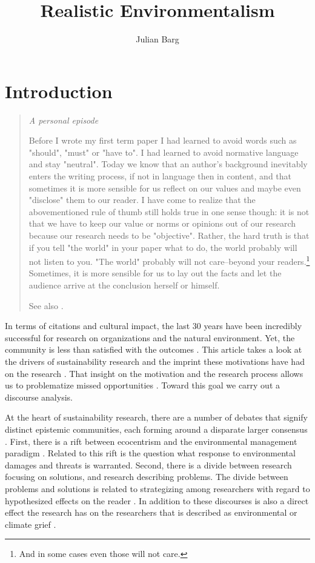 \documentclass{article}
\title{Realistic Environmentalism}
\author{Julian Barg}
\begin{document}
	\maketitle

	\section*{Introduction}

	\begin{quote}
		\itshape
		A personal episode

		Before I wrote my first term paper I had learned to avoid words such as "should", "must" or "have to". I had learned to avoid normative language and stay "neutral". Today we know that an author's background inevitably enters the writing process, if not in language then in content, and that sometimes it is more sensible for us reflect on our values and maybe even "disclose" them to our reader. I have come to realize that the abovementioned rule of thumb still holds true in one sense though: it is not that we have to keep our value or norms or opinions out of our research because our research needs to be "objective". Rather, the hard truth is that if you tell "the world" in your paper what to do, the world probably will not listen to you. "The world" probably will not care--beyond your readers.\footnote{And in some cases even those will not care.} Sometimes, it is more sensible for us to lay out the facts and let the audience arrive at the conclusion herself or himself.

		See also \citet{Gouldner1962,Zbaracki2021-02-03,Jones2019,Boisot2010}.
	\end{quote}

	In terms of citations and cultural impact, the last 30 years have been incredibly successful for research on organizations and the natural environment. Yet, the community is less than satisfied with the outcomes \cite[e.g.,][]{Ergene2020}. This article takes a look at the drivers of sustainability research and the imprint these motivations have had on the research \citep{Latour1987}. That insight on the motivation and the research process allows us to problematize missed opportunities \citep{Alvesson2011}. Toward this goal we carry out a discourse analysis.

	At the heart of sustainability research, there are a number of debates that signify distinct epistemic communities, each forming around a disparate larger consensus \citep[cf.][]{KnorrCetina1999}. First, there is a rift between ecocentrism and the environmental management paradigm \citep{Purser1995}. Related to this rift is the question what response to environmental damages and threats is warranted. Second, there is a divide between research focusing on solutions, and research describing problems. The divide between problems and solutions is related to strategizing among researchers with regard to hypothesized effects on the reader \citep{Westoby2019}. In addition to these discourses is also a direct effect the research has on the researchers that is described as environmental or climate grief \citep{Conroy2019,Cunsolo2018}.
\end{document}
